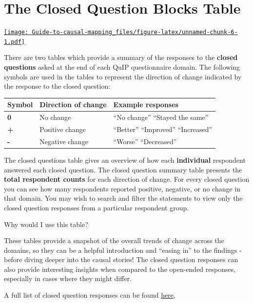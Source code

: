 \documentclass[
]{book}
\begin{document}
\hypertarget{xthe-closed-question-blocks-table}{%
\chapter{The Closed Question Blocks Table}\label{xthe-closed-question-blocks-table}}

\href{https://player.vimeo.com/video/596497752}{\texttt{[image: Guide-to-causal-mapping\_files/figure-latex/unnamed-chunk-6-1.pdf]}}

There are two tables which provide a summary of the responses to the \textbf{closed questions} asked at the end of each QuIP questionnaire domain. The following symbols are used in the tables to represent the direction of change indicated by the response to the closed question:

\begin{longtable}[]{@{}lll@{}}
\toprule
\textbf{Symbol} & \textbf{Direction of change} & \textbf{Example responses} \\
\midrule
\endhead
\textbf{0} & No change & ``No change'' ``Stayed the same'' \\
\textbf{+} & Positive change & ``Better'' ``Improved'' ``Increased'' \\
\textbf{-} & Negative change & ``Worse'' ``Decreased'' \\
\bottomrule
\end{longtable}

The closed questions table gives an overview of how each \textbf{individual} respondent answered each closed question. The closed question summary table presents the \textbf{total respondent counts} for each direction of change. For every closed question you can see how many respondents reported positive, negative, or no change in that domain. You may wish to search and filter the statements to view only the closed question responses from a particular respondent group.

Why would I use this table?

These tables provide a snapshot of the overall trends of change across the domains, so they can be a helpful introduction and ``easing in'' to the findings - before diving deeper into the causal stories! The closed question responses can also provide interesting insights when compared to the open-ended responses, especially in cases where they might differ.

A full list of closed question responses can be found \href{https://guide.causalmap.app/importing-your-data-special-cases.html?q=recodes\#quip-recodes-for-closed-questions---live-link}{here}.
\end{document}
